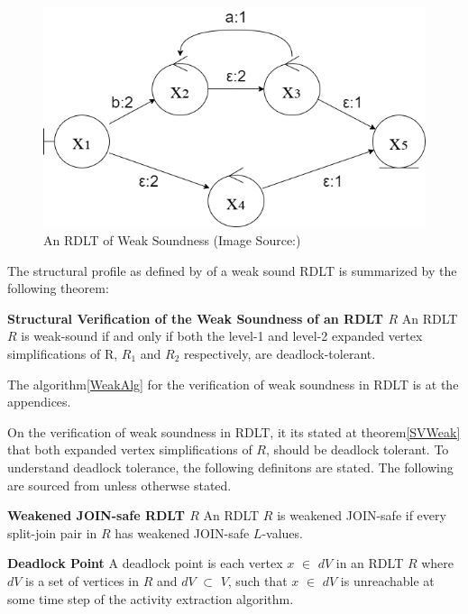 \begin{figure}[H]
    \centering
    \includegraphics[width=12cm]{figures/RDLT Weak.png}
    \caption{An RDLT of Weak Soundness (Image Source:\cite{Ramirez2024})}\label{RDLTWeak}
\end{figure}

The structural profile as defined by\cite{Ramirez2024} of a weak sound RDLT is summarized by the following theorem:
\begin{thm}\textbf{Structural Verification of the Weak Soundness of an RDLT $ R $}\label{SVWeak}
\cite{Ramirez2024}
    An RDLT $ R $ is weak-sound if and only if both the level-1 and level-2 expanded vertex simplifications of R, $ R_1 $ and $ R_2 $ respectively, are deadlock-tolerant.
\end{thm}

The algorithm\ref{WeakAlg} for the verification of weak soundness in RDLT is at the appendices.

On the verification of weak soundness in RDLT, it its stated at theorem\ref{SVWeak} that both expanded vertex simplifications of $R$, should be deadlock tolerant. To understand deadlock tolerance, the following definitons are stated. The following are sourced from \cite{Ramirez2024} unless otherwse stated.

\begin{defn}\textbf{Weakened JOIN-safe RDLT $ R $}\cite{Ramirez2024}\label{WJRDLT}
    An RDLT $ R $ is weakened JOIN-safe if every split-join pair in $ R $ has weakened JOIN-safe $ L $-values.
\end{defn}

\begin{defn}\textbf{Deadlock Point}
    \cite{Ramirez2024}
    \label{DLP}
    A deadlock point is each vertex $ x $ $ \in $ $ dV $ in an RDLT $ R $ where $ dV $ is a set of vertices in $ R $ and $ dV $ $ \subset $ $ V $, such that $ x $ $ \in $ $ dV $ is unreachable at some time step of the activity extraction algorithm.
\end{defn}

